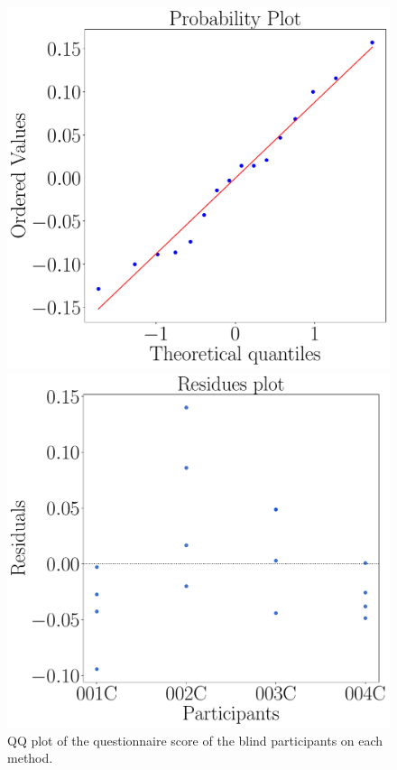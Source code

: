\begin{figure}[!thb]
    \centering
    \begin{minipage}{0.45\textwidth}
        \centering
        \includegraphics[width = \textwidth]{Resultados/Questionario/Figuras/pdf/qqplot_questionnaire_blind.pdf}
        \caption{QQ plot of the questionnaire score of the blind participants on each method.}
        \label{fig:qqplot_questionnaire_blind}
    \end{minipage}
    \begin{minipage}{0.075\textwidth}
        \hfill
    \end{minipage}
    \begin{minipage}{0.45\textwidth}
        \centering
        \includegraphics[width = \textwidth]{Resultados/Questionario/Figuras/pdf/residplot_questionnaire_blind.pdf}

\end{minipage}
\end{figure}
